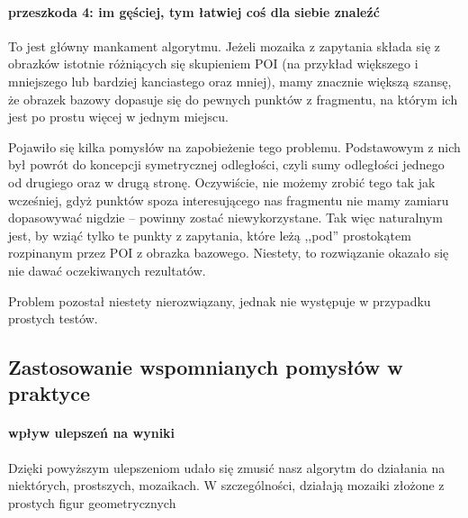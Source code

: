 \documentclass[a4paper,12pt,leqno]{article}
\begin{document}
\paragraph{przeszkoda 4: im gęściej, tym łatwiej coś dla siebie znaleźć}
To jest główny mankament algorytmu. Jeżeli mozaika z zapytania składa się z obrazków istotnie różniących się skupieniem POI 
(na przykład większego i mniejszego lub bardziej kanciastego oraz mniej), mamy znacznie większą szansę, że obrazek bazowy dopasuje się do pewnych punktów z fragmentu, 
na którym ich jest po prostu więcej w jednym miejscu.

Pojawiło się kilka pomysłów na zapobieżenie tego problemu. Podstawowym z nich był powrót do koncepcji symetrycznej odległości, czyli sumy odległości jednego od drugiego oraz w drugą stronę.
Oczywiście, nie możemy zrobić tego tak jak wcześniej, gdyż punktów spoza interesującego nas fragmentu nie mamy zamiaru dopasowywać nigdzie -- powinny zostać niewykorzystane.
Tak więc naturalnym jest, by wziąć tylko te punkty z zapytania, które leżą ,,pod'' prostokątem rozpinanym przez POI z obrazka bazowego. Niestety, to rozwiązanie okazało się nie dawać 
oczekiwanych rezultatów.

Problem pozostał niestety nierozwiązany, jednak nie występuje w przypadku prostych testów.

\subsection{Zastosowanie wspomnianych pomysłów w praktyce}
\paragraph{wpływ ulepszeń na wyniki}
Dzięki powyższym ulepszeniom udało się zmusić nasz algorytm do działania na niektórych, prostszych, mozaikach. W szczególności, działają mozaiki złożone z prostych figur geometrycznych
\end{document}
